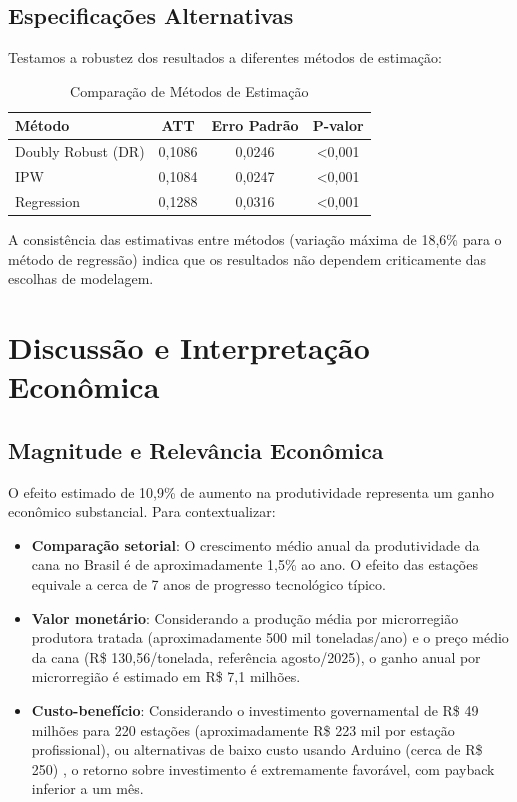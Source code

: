 \documentclass[
	12pt,				%
	openright,			%
	oneside,			%
	a4paper,			%
	english,			%
	french,				%
	spanish,			%
	brazil				%
	]{abntex2}
\begin{document}
\subsection{Especificações Alternativas}

Testamos a robustez dos resultados a diferentes métodos de estimação:

\begin{table}[htbp]
\centering
\caption{Comparação de Métodos de Estimação}
\label{tab:metodos}
\begin{tabular}{lccc}
\toprule
Método & ATT & Erro Padrão & P-valor \\
\midrule
Doubly Robust (DR) & 0,1086 & 0,0246 & <0,001 \\
IPW & 0,1084 & 0,0247 & <0,001 \\
Regression & 0,1288 & 0,0316 & <0,001 \\
\bottomrule
\end{tabular}
\end{table}

A consistência das estimativas entre métodos (variação máxima de 18,6\% para o método de regressão) indica que os resultados não dependem criticamente das escolhas de modelagem.


\section{Discussão e Interpretação Econômica}

\subsection{Magnitude e Relevância Econômica}

O efeito estimado de 10,9\% de aumento na produtividade representa um ganho econômico substancial. Para contextualizar:

\begin{itemize}
\item \textbf{Comparação setorial}: O crescimento médio anual da produtividade da cana no Brasil é de aproximadamente 1,5\% ao ano. O efeito das estações equivale a cerca de 7 anos de progresso tecnológico típico.

\item \textbf{Valor monetário}: Considerando a produção média por microrregião produtora tratada (aproximadamente 500 mil toneladas/ano) e o preço médio da cana (R\$ 130,56/tonelada, referência agosto/2025), o ganho anual por microrregião é estimado em R\$ 7,1 milhões.

\item \textbf{Custo-benefício}: Considerando o investimento governamental de R\$ 49 milhões para 220 estações \cite{mapa2025} (aproximadamente R\$ 223 mil por estação profissional), ou alternativas de baixo custo usando Arduino (cerca de R\$ 250) \cite{arduino2021}, o retorno sobre investimento é extremamente favorável, com payback inferior a um mês.
\end{itemize}
\end{document}
